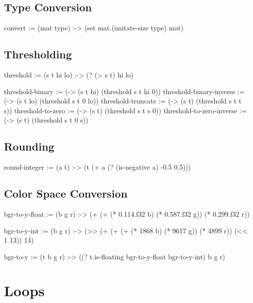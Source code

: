 \documentclass[twoside=false, numbers=noenddot]{scrbook}
\newenvironment{likely}
{ \verbatim }
{ \endverbatim }
\begin{document}
\section{Type Conversion}
\begin{likely}
convert :=
  (mat type) :->
    (set mat.(imitate-size type) mat)
\end{likely}

\section{Thresholding}
\begin{likely}
threshold :=
  (s t hi lo) :->
    (? (> s t) hi lo)

threshold-binary          := (-> (s t hi) (threshold s t hi 0))
threshold-binary-inverse  := (-> (s t lo) (threshold s t 0  lo))
threshold-truncate        := (-> (s t)    (threshold s t t  s))
threshold-to-zero         := (-> (s t)    (threshold s t s  0))
threshold-to-zero-inverse := (-> (s t)    (threshold s t 0  s))
\end{likely}

\section{Rounding}
\begin{likely}
round-integer :=
  (a t) :->
    (t (+ a (? (is-negative a) -0.5 0.5)))
\end{likely}

\section{Color Space Conversion}
\begin{likely}
bgr-to-y-float :=
  (b g r) :->
    (+ (+ (* 0.114.f32 b) (* 0.587.f32 g)) (* 0.299.f32 r))

bgr-to-y-int :=
  (b g r) :->
    (>> (+ (+ (+ (* 1868 b) (* 9617 g)) (* 4899 r)) (<< 1 13)) 14)

bgr-to-y :=
  (t b g r) :->
    ((? t.is-floating bgr-to-y-float bgr-to-y-int) b g r)
\end{likely}

\chapter{Loops}
\end{document}
